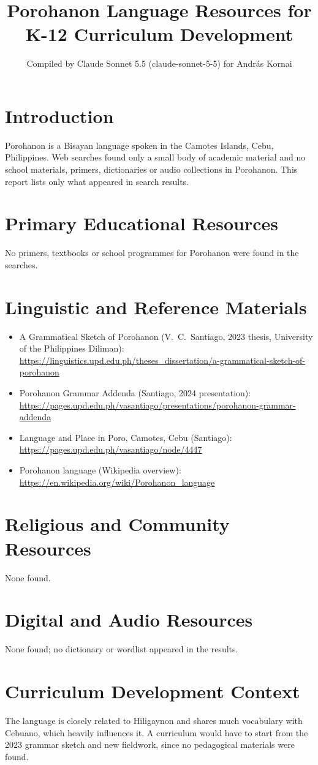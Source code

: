 \documentclass[12pt]{article}
\title{Porohanon Language Resources for K-12 Curriculum Development}
\author{Compiled by Claude Sonnet 5.5 (claude-sonnet-5-5) for Andr\'as Kornai}
\date{}
\begin{document}
\maketitle
\section{Introduction}
Porohanon is a Bisayan language spoken in the Camotes Islands, Cebu, Philippines. Web searches found only a small body of academic material and no school materials, primers, dictionaries or audio collections in Porohanon. This report lists only what appeared in search results.
\section{Primary Educational Resources}
No primers, textbooks or school programmes for Porohanon were found in the searches.
\section{Linguistic and Reference Materials}
\begin{itemize}
\item A Grammatical Sketch of Porohanon (V.\ C.\ Santiago, 2023 thesis, University of the Philippines Diliman): \url{https://linguistics.upd.edu.ph/theses_dissertation/a-grammatical-sketch-of-porohanon}
\item Porohanon Grammar Addenda (Santiago, 2024 presentation): \url{https://pages.upd.edu.ph/vasantiago/presentations/porohanon-grammar-addenda}
\item Language and Place in Poro, Camotes, Cebu (Santiago): \url{https://pages.upd.edu.ph/vasantiago/node/4447}
\item Porohanon language (Wikipedia overview): \url{https://en.wikipedia.org/wiki/Porohanon_language}
\end{itemize}
\section{Religious and Community Resources}
None found.
\section{Digital and Audio Resources}
None found; no dictionary or wordlist appeared in the results.
\section{Curriculum Development Context}
The language is closely related to Hiligaynon and shares much vocabulary with Cebuano, which heavily influences it. A curriculum would have to start from the 2023 grammar sketch and new fieldwork, since no pedagogical materials were found.
\end{document}
